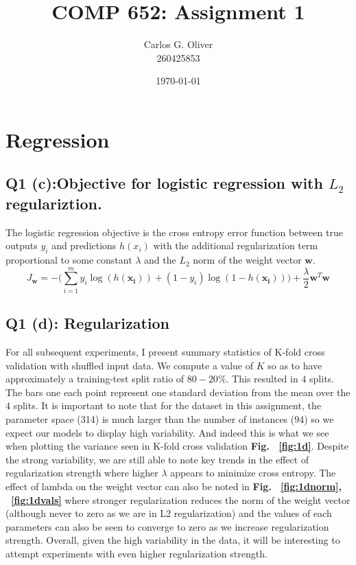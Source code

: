 \documentclass[11pt]{amsart}
\title{COMP 652: Assignment 1}
\author{Carlos G. Oliver \\ 260425853}
\date{\today}                                           %
\newcommand{\vek}[1]{\mathbf{#1}}
\begin{document}
\maketitle
\section{Regression}
\subsection{Q1 (c):Objective for logistic regression with $L_{2}$ regulariztion.}

The logistic regression objective is the cross entropy error function between true outputs $y_i$ and predictions $h(x_i)$ with the additional regularization term proportional to some constant $\lambda$ and the $L_2$ norm of the weight vector $\vek{w}$.
\begin{equation}
J_{\vek{w}} =  -\bigg(\sum_{i=1}^{m} y_{i}\log(h(\vek{x_{i}})) + (1 - y_{i})\log(1 - h(\vek{x_{i}}))\bigg) + \frac{\lambda}{2}\vek{w}^T\vek{w}
\end{equation}

\subsection{Q1 (d): Regularization}

For all subsequent experiments, I present summary statistics of K-fold cross validation with shuffled input data. We compute a value of $K$ so as to have approximately a training-test split ratio of $80-20\%$. This resulted in $4$ splits. The bars one each point represent one standard deviation from the mean over the $4$ splits. It is important to note that for the dataset in this assignment, the parameter space (314) is much larger than the number of instances (94) so we expect our models to display high variability. And indeed this is what we see when plotting the variance seen in K-fold cross validation {\bf Fig. ~\ref{fig:1d}}. Despite the strong variability, we are still able to note key trends in the effect of regularization strength where higher $\lambda$ appears to minimize cross entropy. The effect of lambda on the weight vector can also be noted in {\bf Fig. ~\ref{fig:1dnorm}, ~\ref{fig:1dvals}} where stronger regularization reduces the norm of the weight vector (although never to zero as we are in L2 regularization) and the values of each parameters can also be seen to converge to zero as we increase regularization strength. Overall, given the high variability in the data, it will be interesting to attempt experiments with even higher regularization strength.
\end{document}
